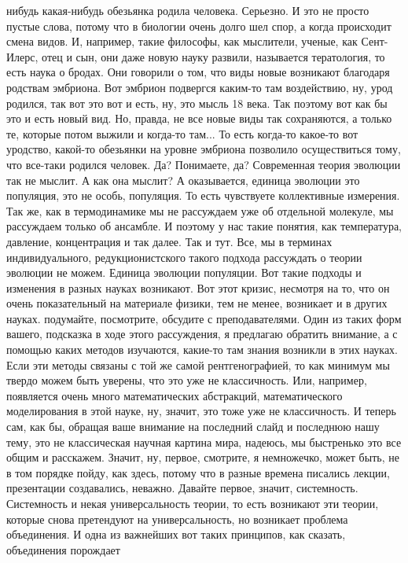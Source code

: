 нибудь какая-нибудь обезьянка родила человека. Серьезно. И это не просто пустые
слова, потому что в биологии очень долго шел спор, а когда происходит смена
видов. И, например, такие философы, как мыслители, ученые, как Сент-Илерс, отец
и сын, они даже новую науку развили, называется тератология, то есть наука о
бродах. Они говорили о том, что виды новые возникают благодаря родствам
эмбриона. Вот эмбрион подвергся каким-то там воздействию, ну, урод родился, так
вот это вот и есть, ну, это мысль 18 века. Так поэтому вот как бы это и есть
новый вид. Но, правда, не все новые виды так сохраняются, а только те, которые
потом выжили и когда-то там... То есть когда-то какое-то вот уродство, какой-то
обезьянки на уровне эмбриона позволило осуществиться тому, что все-таки родился
человек. Да? Понимаете, да? Современная теория эволюции так не мыслит. А как она
мыслит? А оказывается, единица эволюции это популяция, это не особь, популяция.
То есть чувствуете коллективные измерения. Так же, как в термодинамике мы не
рассуждаем уже об отдельной молекуле, мы рассуждаем только об ансамбле. И
поэтому у нас такие понятия, как температура, давление, концентрация и так
далее. Так и тут. Все, мы в терминах индивидуального, редукционистского такого
подхода рассуждать о теории эволюции не можем. Единица эволюции популяции. Вот
такие подходы и изменения в разных науках возникают. Вот этот кризис, несмотря
на то, что он очень показательный на материале физики, тем не менее, возникает и
в других науках. подумайте, посмотрите, обсудите с преподавателями. Один из
таких форм вашего, подсказка в ходе этого рассуждения, я предлагаю обратить
внимание, а с помощью каких методов изучаются, какие-то там знания возникли в
этих науках. Если эти методы связаны с той же самой рентгенографией, то как
минимум мы твердо можем быть уверены, что это уже не классичность. Или,
например, появляется очень много математических абстракций, математического
моделирования в этой науке, ну, значит, это тоже уже не классичность. И теперь
сам, как бы, обращая ваше внимание на последний слайд и последнюю нашу тему, это
не классическая научная картина мира, надеюсь, мы быстренько это все общим и
расскажем. Значит, ну, первое, смотрите, я немножечко, может быть, не в том
порядке пойду, как здесь, потому что в разные времена писались лекции,
презентации создавались, неважно. Давайте первое, значит, системность.
Системность и некая универсальность теории, то есть возникают эти теории,
которые снова претендуют на универсальность, но возникает проблема объединения.
И одна из важнейших вот таких принципов, как сказать, объединения порождает

